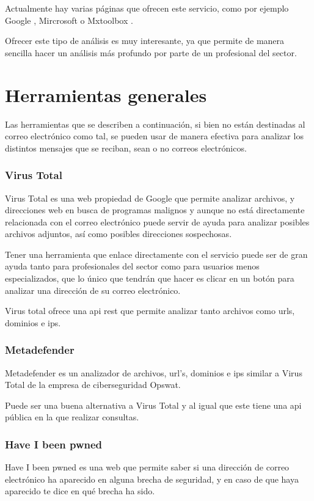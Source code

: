 Actualmente hay varias páginas que ofrecen este servicio, como por ejemplo Google \cite{header_google_analyzer}, Mircrosoft \cite{header_microsoft_analyzer} o Mxtoolbox \cite{header_mxtoolbox_analyzer}.

Ofrecer este tipo de análisis es muy interesante, ya que permite de manera sencilla hacer un análisis más profundo por parte de un profesional del sector.

\section{Herramientas generales}
Las herramientas que se describen a continuación, si bien no están destinadas al correo electrónico como tal, se pueden usar de manera efectiva para analizar los distintos mensajes que se reciban, sean o no correos electrónicos. 

\subsubsection{Virus Total} 
Virus Total \cite{virus_total} es una web propiedad de Google que permite analizar archivos, y direcciones web en busca de programas malignos y aunque no está directamente relacionada con el correo electrónico puede servir de ayuda para analizar posibles archivos adjuntos, así como posibles direcciones sospechosas.

Tener una herramienta que enlace directamente con el servicio puede ser de gran ayuda tanto para profesionales del sector como para usuarios menos especializados, que lo único que tendrán que hacer es clicar en un botón para analizar una dirección de su correo electrónico. 

Virus total ofrece una api rest que permite analizar tanto archivos como urls, dominios e ips.\cite{virus_total_api}

\subsubsection{Metadefender}
Metadefender \cite{metadefender} es un analizador de archivos, url’s, dominios e ips similar a Virus Total de la empresa de ciberseguridad Opswat.

Puede ser una buena alternativa a Virus Total y al igual que este tiene una api pública \cite{metadefender_api} en la que realizar consultas. 

\subsubsection{Have I been pwned}
Have I been pwned \cite{Have_I_been_pwned} es una web que permite saber si una dirección de correo electrónico ha aparecido en alguna brecha de seguridad, y en caso de que haya aparecido te dice en qué brecha ha sido.

